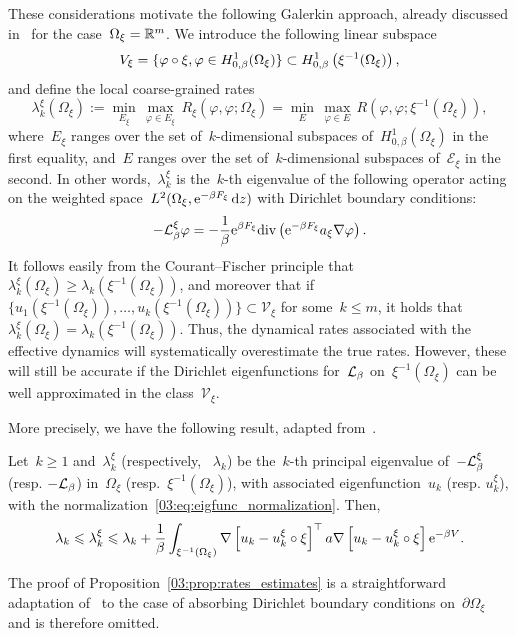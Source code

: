     These considerations motivate the following Galerkin approach, already discussed in~\cite[Section 3.3.2]{ZHS16} for the case~$\Omega_\xi=\mathbb{R}^m$.
    We introduce the following linear subspace
    \begin{equation}
        \mathcal \mathcal V_\xi = \{\varphi\circ \xi,\varphi\in H_{0,\beta}^1(\Omega_\xi)\} \subset H_{0,\beta}^1\left(\xi^{-1}(\Omega_\xi)\right),
    \end{equation}
    and define the local coarse-grained rates
    \begin{equation}
        \label{03:eq:variational_principle_xi}
        \lambda^\xi_k(\Omega_\xi) := \underset{E_\xi}{\min}\,\underset{\varphi\in E_\xi}{\max}\,R_\xi(\varphi,\varphi;\Omega_\xi) = \underset{E}{\min}\,\underset{\varphi\in E}{\max}\,R\left(\varphi,\varphi;\xi^{-1}(\Omega_\xi)\right),
    \end{equation}
    where~$E_\xi$ ranges over the set of~$k$-dimensional subspaces of~$H_{0,\beta}^1(\Omega_\xi)$ in the first equality, and~$E$ ranges over the set of~$k$-dimensional subspaces of~$\mathcal E_\xi$ in the second.
    In other words,~$\lambda^\xi_k$ is the~$k$-th eigenvalue of the following operator acting on the weighted space~$L^2(\Omega_\xi,\mathrm{e}^{-\beta F_\xi}\,\mathrm{d} z)$ with Dirichlet boundary conditions:
    \[-\mathcal{L}^\xi_\beta\varphi = -\frac{1}{\beta}\mathrm{e}^{\beta F_\xi}\mathrm{div}\left(\mathrm{e}^{-\beta F_\xi}a_\xi\nabla\varphi\right).\]
    It follows easily from the Courant--Fischer principle that~$\lambda^\xi_k(\Omega_\xi)\geq \lambda_k(\xi^{-1}(\Omega_\xi))$, and moreover that if~$\{u_1(\xi^{-1}(\Omega_\xi)),\dots,u_k(\xi^{-1}(\Omega_\xi))\}\subset \mathcal V_\xi$ for some~$k\leq m$, it holds that~$\lambda_k^\xi(\Omega_\xi) = \lambda_k(\xi^{-1}(\Omega_\xi))$.
    Thus, the dynamical rates associated with the effective dynamics will systematically overestimate the true rates. However, these will still be accurate if the Dirichlet eigenfunctions for~$\mathcal{L}_\beta$ on~$\xi^{-1}(\Omega_\xi)$ can be well approximated in the class~$\mathcal V_\xi$.

    More precisely, we have the following result, adapted from~\cite[Proposition 5]{ZHS16}.
    \begin{proposition}
        \label{03:prop:rates_estimates}
        Let~$k\geq 1$ and~$\lambda^\xi_k$ (respectively, ~$\lambda_k$) be the~$k$-th principal eigenvalue of~$-\mathcal{L}^\xi_\beta$ (resp. $-\mathcal{L}_\beta$) in~$\Omega_\xi$ (resp.~$\xi^{-1}(\Omega_\xi)$), with associated eigenfunction~$u_k$ (resp. $u_k^\xi$), with the normalization~\eqref{03:eq:eigfunc_normalization}.
        Then,
        \begin{equation}
            \label{03:eq:rates_inequalities}
            \lambda_k \leqslant \lambda^\xi_k \leqslant \lambda_k + \frac1\beta\int_{\xi^{-1}(\Omega_\xi)}\nabla\left[u_k-u_k^\xi\circ\xi\right]^\top a\nabla\left[u_k-u_k^\xi\circ\xi\right]\mathrm{e}^{-\beta V}.
        \end{equation}
    \end{proposition}
    The proof of Proposition~\ref{03:prop:rates_estimates} is a straightforward adaptation of~\cite[Proposition 5]{ZHS16} to the case of absorbing Dirichlet boundary conditions on~$\partial\Omega_\xi$ and is therefore omitted.

